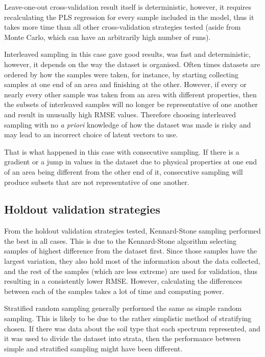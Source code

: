 \documentclass{isprs}
\begin{document}
Leave-one-out cross-validation result itself is deterministic, however, it requires recalculating the PLS regression for every sample included in the model, thus it takes more time than all other cross-validation strategies tested (aside from Monte Carlo, which can have an arbitrarily high number of runs).

Interleaved sampling in this case gave good results, was fast and deterministic, however, it depends on the way the dataset is organised. Often times datasets are ordered by how the samples were taken, for instance, by starting collecting samples at one end of an area and finishing at the other. However, if every or nearly every other sample was taken from an area with different properties, then the subsets of interleaved samples will no longer be representative of one another and result in unusually high RMSE values. Therefore choosing interleaved sampling with no \textit{a priori} knowledge of how the dataset was made is risky and may lead to an incorrect choice of latent vectors to use.

That is what happened in this case with consecutive sampling. If there is a gradient or a jump in values in the dataset due to physical properties at one end of an area being different from the other end of it, consecutive sampling will produce subsets that are not representative of one another.

\subsection{Holdout validation strategies}\label{sec:Holdout validation strategies 3}

From the holdout validation strategies tested, Kennard-Stone sampling performed the best in all cases. This is due to the Kennard-Stone algorithm selecting samples of highest difference from the dataset first. Since those samples have the largest variation, they also hold most of the information about the data collected, and the rest of the samples (which are less extreme) are used for validation, thus resulting in a consistently lower RMSE. However, calculating the differences between each of the samples takes a lot of time and computing power.

Stratified random sampling generally performed the same as simple random sampling. This is likely to be due to the rather simplistic method of stratifying chosen. If there was data about the soil type that each spectrum represented, and it was used to divide the dataset into strata, then the performance between simple and stratified sampling might have been different.
\end{document}
